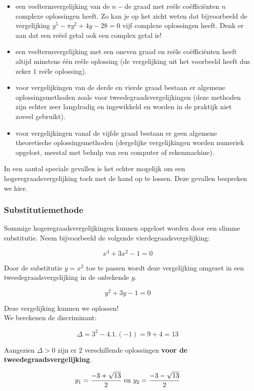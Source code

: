 \begin{itemize}
\item een veeltermvergelijking van de $n-$de graad met re\"{e}le co\"{e}ffici\"{e}nten $n$ complexe oplossingen heeft. Zo kan je op het zicht weten dat bijvoorbeeld de vergelijking $y^5 - \pi y^2 + 4y -28 = 0$ vijf complexe oplossingen heeft. Denk er aan dat een re\"{e}el getal ook een complex getal is!
\item een veeltermvergelijking met een oneven graad en re\"{e}le co\"{e}ffici\"{e}nten heeft altijd minstens \'{e}\'{e}n re\"{e}le oplossing (de vergelijking uit het voorbeeld heeft dus zeker $1$ re\"{e}le oplossing).
\item voor vergelijkingen van de derde en vierde graad bestaan er algemene oplossingsmethoden zoals voor tweedegraadsvergelijkingen (deze methoden zijn echter zeer langdradig en ingewikkeld en worden in de praktijk niet zoveel gebruikt).
\item voor vergelijkingen vanaf de vijfde graad bestaan er geen algemene theoretische oplossingsmethoden (dergelijke vergelijkingen worden numeriek opgelost, meestal met behulp van een computer of rekenmachine).
\end{itemize}

In een aantal speciale gevallen is het echter mogelijk om een hogeregraadsvergelijking toch met de hand op te lossen. Deze gevallen bespreken we hier.

\subsubsection{Substitutiemethode}

Sommige hogeregraadsvergelijkingen kunnen opgelost worden door een slimme substitutie.  Neem bijvoorbeeld de volgende vierdegraadsvergelijking:

\[x^4+3x^2-1=0\]

Door de substitutie $y=x^2$ toe te passen wordt deze vergelijking omgezet in een tweedegraadsvergelijking in de onbekende $y$.

\[ y^2+3y-1=0\]

Deze vergelijking kunnen we oplossen!\\
We berekenen de discriminant:

\[ \Delta= 3^2 - 4.1.(-1)=9+4=13 \]

Aangezien $\Delta >0$ zijn er $2$  verschillende oplossingen {\bf voor de tweedegraadsvergelijking}.

\[ y_{1}=\frac{-3 + \sqrt{13}}{2} \textup{  en  } y_{2}=\frac{-3 - \sqrt{13}}{2} \]


